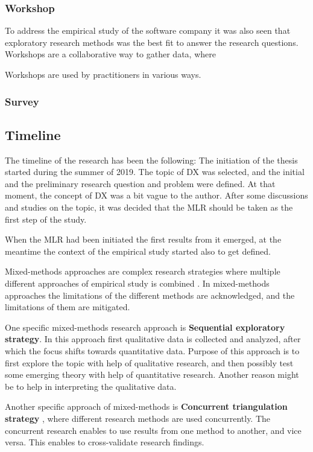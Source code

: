 \documentclass[english, 12pt, a4paper, sci, utf8, a-1b, online]{aaltothesis}
\begin{document}
\subsubsection{Workshop}

To address the empirical study of the software company it was also seen that exploratory research methods was the best fit to answer the research questions. Workshops are a collaborative way to gather data, where

Workshops are used by practitioners in various ways.

\subsubsection{Survey}

\subsection{Timeline}

The timeline of the research has been the following: The initiation of the thesis started during the summer of 2019. The topic of DX was selected, and the initial and the preliminary research question and problem were defined. At that moment, the concept of DX was a bit vague to the author. After some discussions and studies on the topic, it was decided that the MLR should be taken as the first step of the study.

When the MLR had been initiated the first results from it emerged, at the meantime the context of the empirical study started also to get defined.

Mixed-methods approaches are complex research strategies where multiple different approaches of empirical study is combined \citep{easterbrook2008selecting}. In mixed-methods approaches the limitations of the different methods are acknowledged, and the limitations of them are mitigated.

One specific mixed-methods research approach is \textbf{Sequential exploratory strategy}. In this approach first qualitative data is collected and analyzed, after which the focus shifts towards quantitative data. Purpose of this approach is to first explore the topic with help of qualitative research, and then possibly test some emerging theory with help of quantitative research. Another reason might be to help in interpreting the qualitative data.

Another specific approach of mixed-methods is \textbf{Concurrent triangulation strategy} \citep{easterbrook2008selecting}, where different research methods are used concurrently. The concurrent research enables to use results from one method to another, and vice versa. This enables to cross-validate research findings.
\end{document}
